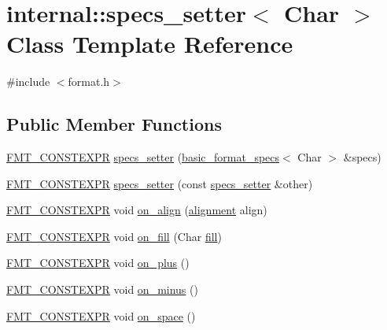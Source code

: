 \hypertarget{classinternal_1_1specs__setter}{}\section{internal\+:\+:specs\+\_\+setter$<$ Char $>$ Class Template Reference}
\label{classinternal_1_1specs__setter}


{\ttfamily \#include $<$format.\+h$>$}

\subsection*{Public Member Functions}
\begin{DoxyCompactItemize}
\item 
\hyperlink{core_8h_a69201cb276383873487bf68b4ef8b4cd}{F\+M\+T\+\_\+\+C\+O\+N\+S\+T\+E\+X\+PR} \hyperlink{classinternal_1_1specs__setter_a36afda80a8421700e9293a4271bea4ea}{specs\+\_\+setter} (\hyperlink{structbasic__format__specs}{basic\+\_\+format\+\_\+specs}$<$ Char $>$ \&specs)
\item 
\hyperlink{core_8h_a69201cb276383873487bf68b4ef8b4cd}{F\+M\+T\+\_\+\+C\+O\+N\+S\+T\+E\+X\+PR} \hyperlink{classinternal_1_1specs__setter_a2fc19308b1c3c83c5eea29975b12c9b9}{specs\+\_\+setter} (const \hyperlink{classinternal_1_1specs__setter}{specs\+\_\+setter} \&other)
\item 
\hyperlink{core_8h_a69201cb276383873487bf68b4ef8b4cd}{F\+M\+T\+\_\+\+C\+O\+N\+S\+T\+E\+X\+PR} void \hyperlink{classinternal_1_1specs__setter_a42211d2885e3317f39790553aedafdd3}{on\+\_\+align} (\hyperlink{format_8h_a5460ac1c70db05be4ec2268f463ea981}{alignment} align)
\item 
\hyperlink{core_8h_a69201cb276383873487bf68b4ef8b4cd}{F\+M\+T\+\_\+\+C\+O\+N\+S\+T\+E\+X\+PR} void \hyperlink{classinternal_1_1specs__setter_a9b55facc3431eafc99a184eb6edba152}{on\+\_\+fill} (Char \hyperlink{structinternal_1_1fill}{fill})
\item 
\hyperlink{core_8h_a69201cb276383873487bf68b4ef8b4cd}{F\+M\+T\+\_\+\+C\+O\+N\+S\+T\+E\+X\+PR} void \hyperlink{classinternal_1_1specs__setter_a6e7d9ebef267e0dc2b97d6eb2f16b8c4}{on\+\_\+plus} ()
\item 
\hyperlink{core_8h_a69201cb276383873487bf68b4ef8b4cd}{F\+M\+T\+\_\+\+C\+O\+N\+S\+T\+E\+X\+PR} void \hyperlink{classinternal_1_1specs__setter_a757602c824fafe82d1b85843dd8193c1}{on\+\_\+minus} ()
\item 
\hyperlink{core_8h_a69201cb276383873487bf68b4ef8b4cd}{F\+M\+T\+\_\+\+C\+O\+N\+S\+T\+E\+X\+PR} void \hyperlink{classinternal_1_1specs__setter_a86dccb217e6fff587efff19c7717de04}{on\+\_\+space} ()

\end{DoxyCompactItemize}
